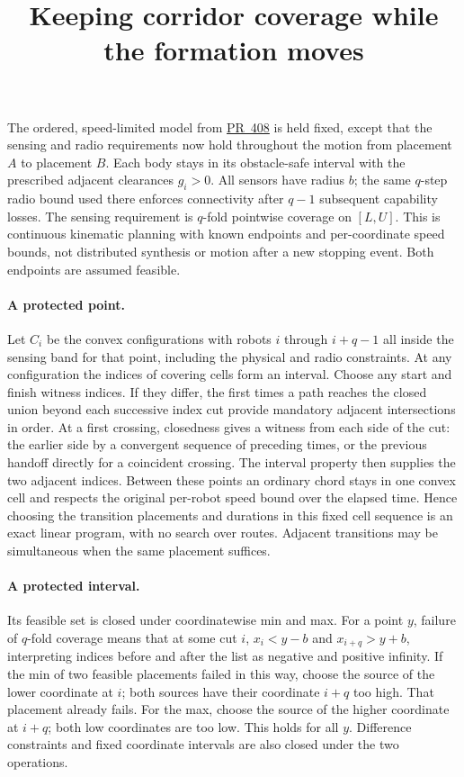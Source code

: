 \documentclass{article}
\title{Keeping corridor coverage while the formation moves}
\date{}
\begin{document}
\maketitle
The ordered, speed-limited model from
\href{https://github.com/eternal-november/eos-research-programmes/pull/408}{PR~408}
is held fixed, except that the sensing and radio requirements now
hold throughout the motion from placement $A$ to placement $B$.
Each body stays in its obstacle-safe interval with the prescribed
adjacent clearances $g_i>0$. All sensors have radius $b$;
the same $q$-step radio bound used there enforces connectivity
after $q-1$ subsequent capability losses. The sensing requirement
is $q$-fold pointwise coverage on $[L,U]$. This is continuous
kinematic planning with known endpoints and per-coordinate speed
bounds, not distributed synthesis or motion after a new stopping
event. Both endpoints are assumed feasible.

\paragraph{A protected point.}
Let $C_i$ be the convex configurations with robots $i$ through
$i+q-1$ all inside the sensing band for that point, including the
physical and radio constraints. At any configuration the indices
of covering cells form an interval. Choose any start and finish
witness indices. If they differ, the first times a path reaches
the closed union beyond each successive index cut provide
mandatory adjacent intersections in order. At a first crossing,
closedness gives a witness from each side of the cut: the earlier
side by a convergent sequence of preceding times, or the previous
handoff directly for a coincident crossing. The interval property
then supplies the two adjacent indices. Between these points an
ordinary chord stays in one convex cell and respects the original
per-robot speed bound over the elapsed time. Hence choosing the
transition placements and durations in this fixed cell sequence is
an exact linear program, with no search over routes. Adjacent
transitions may be simultaneous when the same placement suffices.

\paragraph{A protected interval.}
Its feasible set is closed under coordinatewise min and max.
For a point $y$, failure of $q$-fold coverage means that at some
cut $i$, $x_i<y-b$ and $x_{i+q}>y+b$, interpreting indices before
and after the list as negative and positive infinity. If the min
of two feasible placements failed in this way, choose the source
of the lower coordinate at $i$; both sources have their coordinate
$i+q$ too high. That placement already fails. For the max, choose
the source of the higher coordinate at $i+q$; both low coordinates
are too low. This holds for all $y$. Difference constraints and
fixed coordinate intervals are also closed under the two operations.
\end{document}

